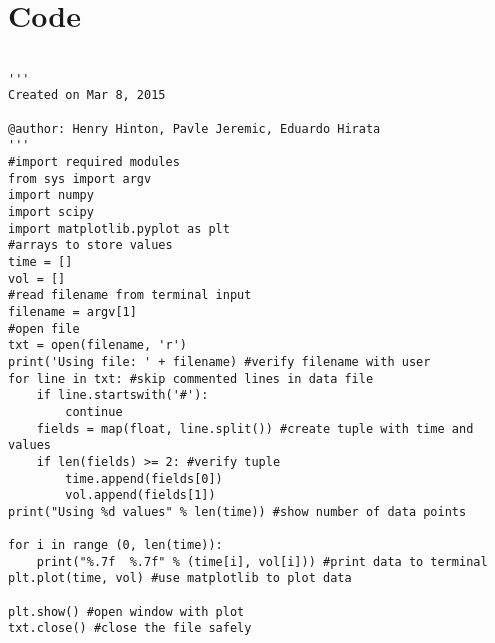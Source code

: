 \documentclass[11pt, oneside]{article}   	%
\begin{document}
\section{Code}
\begin{lstlisting}

'''
Created on Mar 8, 2015

@author: Henry Hinton, Pavle Jeremic, Eduardo Hirata
'''
#import required modules
from sys import argv
import numpy
import scipy
import matplotlib.pyplot as plt
#arrays to store values
time = []
vol = []
#read filename from terminal input
filename = argv[1]
#open file
txt = open(filename, 'r')
print('Using file: ' + filename) #verify filename with user
for line in txt: #skip commented lines in data file
    if line.startswith('#'):
        continue
    fields = map(float, line.split()) #create tuple with time and values
    if len(fields) >= 2: #verify tuple
        time.append(fields[0])
        vol.append(fields[1])
print("Using %d values" % len(time)) #show number of data points

for i in range (0, len(time)):
    print("%.7f  %.7f" % (time[i], vol[i])) #print data to terminal
plt.plot(time, vol) #use matplotlib to plot data

plt.show() #open window with plot
txt.close() #close the file safely
\end{lstlisting}
\end{document}
